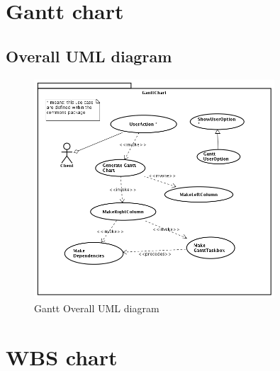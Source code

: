 \documentclass[a4paper, 12pt]{report}
\begin{document}












\chapter{Gantt chart}
\section*{Overall UML diagram}
\begin{figure}[h!] \centering
\includegraphics[width=0.8\textwidth]{Gantt/img/GanttChart.png} 
\caption{Gantt Overall UML diagram}
\label{fig:ganttDiagram}
\end{figure}






\chapter{WBS chart}
\end{document}
